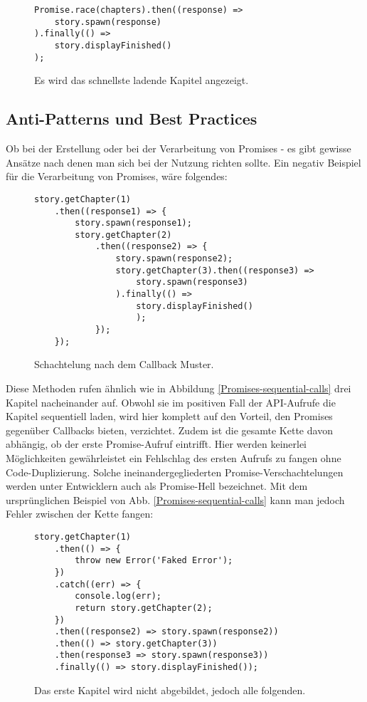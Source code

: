 \begin{figure}[H]
\begin{lstlisting}[basicstyle=\small]
Promise.race(chapters).then((response) =>
    story.spawn(response)
).finally(() =>
    story.displayFinished()
);
\end{lstlisting}
\caption{Es wird das schnellste ladende Kapitel angezeigt.}
\end{figure}

\subsection{Anti-Patterns und Best Practices}

Ob bei der Erstellung oder bei der Verarbeitung von Promises - es gibt gewisse Ansätze nach denen man sich bei der Nutzung richten sollte. Ein negativ Beispiel für die Verarbeitung von Promises, wäre folgendes:

\begin{figure}[H]
\begin{lstlisting}[basicstyle=\small]
story.getChapter(1)
    .then((response1) => {
        story.spawn(response1);
        story.getChapter(2)
            .then((response2) => {
                story.spawn(response2);
                story.getChapter(3).then((response3) =>
                    story.spawn(response3)
                ).finally(() => 
                    story.displayFinished()
                    );
            });
    });
\end{lstlisting}
\caption{Schachtelung nach dem Callback Muster.}
\end{figure}

\noindent
Diese Methoden rufen ähnlich wie in Abbildung \ref{Promises-sequential-calls} drei Kapitel nacheinander auf. Obwohl sie im positiven Fall der API-Aufrufe die Kapitel sequentiell laden, wird hier komplett auf den Vorteil, den Promises gegenüber Callbacks bieten, verzichtet. Zudem ist die gesamte Kette davon abhängig, ob der erste Promise-Aufruf eintrifft. Hier werden keinerlei Möglichkeiten gewährleistet ein Fehlschlag des ersten Aufrufs zu fangen ohne Code-Duplizierung. Solche ineinandergegliederten Promise-Verschachtelungen werden unter Entwicklern auch als \glqq{}Promise-Hell\grqq{} bezeichnet.
Mit dem ursprünglichen Beispiel von Abb. \ref{Promises-sequential-calls} kann man jedoch Fehler zwischen der Kette fangen:

\begin{figure}[H]
\begin{lstlisting}[basicstyle=\small]
story.getChapter(1)
    .then(() => {
        throw new Error('Faked Error');
    })
    .catch((err) => {
        console.log(err);
        return story.getChapter(2);
    })
    .then((response2) => story.spawn(response2))
    .then(() => story.getChapter(3))
    .then(response3 => story.spawn(response3))
    .finally(() => story.displayFinished());
\end{lstlisting}
\caption{Das erste Kapitel wird nicht abgebildet, jedoch alle folgenden.}
\end{figure}

